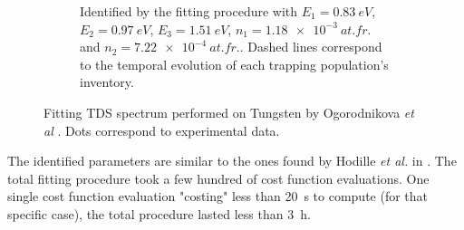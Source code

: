 \begin{figure} [h!]
\begin{subfigure}[t]{0.5\linewidth}
            \caption{Identified by the fitting procedure with $E_1 = \SI{0.83}{eV}$, $E_2 = \SI{0.97}{eV}$, $E_3 = \SI{1.51}{eV}$, $n_1 = \SI{1.18e-3}{at.fr.}$ and \newline $n_2 = \SI{7.22e-4}{at.fr.}$.  Dashed lines correspond to the temporal evolution of each trapping population's inventory.}
            \label{fig:5D TDS}
        \end{subfigure}%
    \caption{Fitting TDS spectrum performed on Tungsten by Ogorodnikova \textit{et  al} \cite{ogorodnikova_deuterium_2003}. Dots correspond to experimental data.}
    \label{fig:TDS ogorodnikova}
\end{figure}
The identified parameters are similar to the ones found by Hodille \textit{et al.} in \cite{hodille_macroscopic_2015}.
The total fitting procedure took a few hundred of cost function evaluations.
One single cost function evaluation "costing" less than \SI{20}{s} to compute (for that specific case), the total procedure lasted less than \SI{3}{h}.





